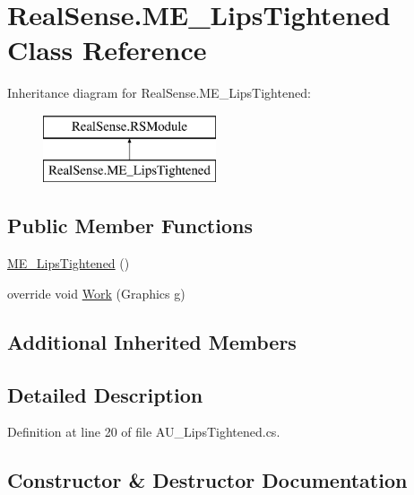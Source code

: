 \hypertarget{class_real_sense_1_1_m_e___lips_tightened}{}\section{Real\+Sense.\+M\+E\+\_\+\+Lips\+Tightened Class Reference}
\label{class_real_sense_1_1_m_e___lips_tightened}
Inheritance diagram for Real\+Sense.\+M\+E\+\_\+\+Lips\+Tightened\+:\begin{figure}[H]
\begin{center}
\leavevmode
\includegraphics[height=2.000000cm]{class_real_sense_1_1_m_e___lips_tightened}
\end{center}
\end{figure}
\subsection*{Public Member Functions}
\begin{DoxyCompactItemize}
\item 
\hyperlink{class_real_sense_1_1_m_e___lips_tightened_a265d553cd92a6032246565121cdddc54}{M\+E\+\_\+\+Lips\+Tightened} ()
\item 
override void \hyperlink{class_real_sense_1_1_m_e___lips_tightened_a9c27cc28f4a2d576196b370e9f9eedf9}{Work} (Graphics g)
\end{DoxyCompactItemize}
\subsection*{Additional Inherited Members}


\subsection{Detailed Description}


Definition at line 20 of file A\+U\+\_\+\+Lips\+Tightened.\+cs.



\subsection{Constructor \& Destructor Documentation}
\mbox{\label{class_real_sense_1_1_m_e___lips_tightened_a265d553cd92a6032246565121cdddc54}} 

